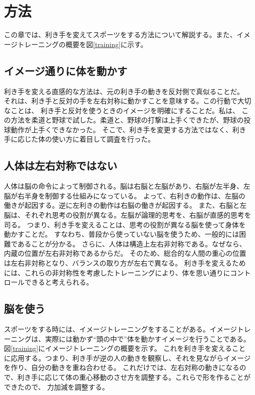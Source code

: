 \documentclass[a4paper,10pt,twocolumn]{jsarticle}
\begin{document}
\section{方法}
この章では、利き手を変えてスポーツをする方法について解説する。また、イメージトレーニングの概要を図\ref{training}に示す。
\vspace{3mm}
\subsection{イメージ通りに体を動かす}
利き手を変える直感的な方法は、元の利き手の動きを反対側で真似ることだ。
それは、利き手と反対の手を左右対称に動かすことを意味する。この行動で大切なことは、
利き手と反対を使うときのイメージを明確にすることだ。\cite{takei_sou}私は、
この方法を柔道と野球で試した。柔道と、野球の打撃は上手くできたが、野球の投球動作が上手くできなかった。
そこで、利き手を変更する方法ではなく、利き手に応じた体の使い方に着目して調査を行った。
\vspace{3mm}
\subsection{人体は左右対称ではない}
人体は脳の命令によって制御される。脳は右脳と左脳があり、右脳が左半身、左脳が右半身を制御する仕組みになっている。
よって、右利きの動作は、左脳の働きが起因する。逆に左利きの動作は右脳の働きが起因する。
また、右脳と左脳は、それぞれ思考の役割が異なる。左脳が論理的思考を、右脳が直感的思考を司る。
つまり、利き手を変えることは、思考の役割が異なる脳を使って身体を動かすことだ。
すなわち、普段から使っていない脳を使うため、一般的には困難であることが分かる。
さらに、人体は構造上左右非対称である。なぜなら、内蔵の位置が左右非対称であるからだ。
そのため、総合的な人間の重心の位置は左右非対称となり、バランスの取り方が左右で異なる。\cite{balance}
利き手を変えるためには、これらの非対称性を考慮したトレーニングにより、体を思い通りにコントロールできると考えられる。
\vspace{3mm}
\subsection{脳を使う}
スポーツをする時には、イメージトレーニングをすることがある。イメージトレーニングは、実際には動かず“頭の中で”体を動かすイメージを行うことである。\cite{img_training}
図\ref{training}にイメージトレーニングの概要を示す。
これを利き手を変えることに応用する。つまり、利き手が逆の人の動きを観察し、それを見ながらイメージを作り、自分の動きを重ね合わせる。
これだけでは、左右対称の動きになるので、利き手に応じて体の重心移動のさせ方を調整する。これらで形を作ることができたので、
力加減を調整する。
\vspace{3mm}
\end{document}
